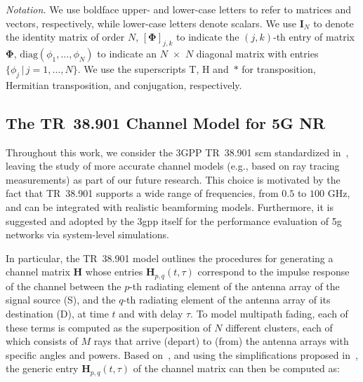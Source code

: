 \emph{Notation.} We use boldface upper- and lower-case letters to refer to matrices and vectors, respectively, while lower-case letters denote scalars. We use $\bm{I}_{N}$ to denote the identity matrix of order $N$, $[ \bm{\Phi} ]_{j, k}$ to indicate the $(j, k)$-th
entry of matrix $\bm{\Phi}$, $\mathrm{diag} ( \phi_1,\dots, \phi_N) $ to indicate an $N$~$\times$~$N$ diagonal matrix with entries $\{\phi_j \, | \, j=1, \dots, N \}$. We use the superscripts T, H and~$*$ for transposition, Hermitian transposition, and conjugation, respectively.


\subsection{The TR~38.901 Channel Model for 5G NR}
 \label{sec:baseline_model}

Throughout this work, we consider the 3GPP TR~38.901 \gls{scm} standardized in~\cite{3gpp.38.901}, leaving the study of more accurate channel models (e.g., based on ray tracing measurements) as part of our future research.
This choice is motivated by the fact that TR~38.901 supports a wide range of frequencies, from $0.5$ to $100$ GHz, and can be integrated with realistic beamforming models. Furthermore, it is suggested and adopted by the \gls{3gpp} itself for the performance evaluation of \gls{5g} networks via system-level simulations.

In particular, the TR~38.901 model outlines the procedures for generating a channel matrix $\bm{H}$ whose entries $\bm{H}_{p, q} (t, \tau)$ correspond to the impulse response of the channel between the $p$-th radiating element of the antenna array of the signal source (S), and the $q$-th radiating element of the antenna array of its destination (D), at time $t$ and with delay $\tau$. 
To model multipath fading, each of these terms is computed as the superposition of $N$ different clusters, each of which consists of $M$ rays that arrive (depart) to (from) the antenna arrays with specific angles and powers. Based on~\cite{3gpp.38.901}, and using the simplifications proposed in~\cite{zugno2020implementation}, the generic entry $\bm{H}_{p, q} (t, \tau)$ of the channel matrix can then be computed as:


